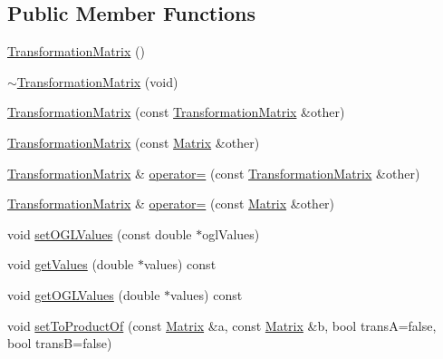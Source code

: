 \subsection*{Public Member Functions}
\begin{DoxyCompactItemize}
\item 
\hyperlink{classCartWheel_1_1Math_1_1TransformationMatrix_aa188aa955061de541799126a392a56b0}{TransformationMatrix} ()
\item 
\hyperlink{classCartWheel_1_1Math_1_1TransformationMatrix_aadbc4b5a1060136e7b5162fa340e537e}{$\sim$TransformationMatrix} (void)
\item 
\hyperlink{classCartWheel_1_1Math_1_1TransformationMatrix_ae75b07262c9166a0f648a3cdb3599c11}{TransformationMatrix} (const \hyperlink{classCartWheel_1_1Math_1_1TransformationMatrix}{TransformationMatrix} \&other)
\item 
\hyperlink{classCartWheel_1_1Math_1_1TransformationMatrix_ad1e2732727abf1943a5ef9443f19eb61}{TransformationMatrix} (const \hyperlink{classCartWheel_1_1Math_1_1Matrix}{Matrix} \&other)
\item 
\hyperlink{classCartWheel_1_1Math_1_1TransformationMatrix}{TransformationMatrix} \& \hyperlink{classCartWheel_1_1Math_1_1TransformationMatrix_a3b85f165673e14e45fa241de4a883ed4}{operator=} (const \hyperlink{classCartWheel_1_1Math_1_1TransformationMatrix}{TransformationMatrix} \&other)
\item 
\hyperlink{classCartWheel_1_1Math_1_1TransformationMatrix}{TransformationMatrix} \& \hyperlink{classCartWheel_1_1Math_1_1TransformationMatrix_ab04a5715c7f1ff7dd912b34abfce10c4}{operator=} (const \hyperlink{classCartWheel_1_1Math_1_1Matrix}{Matrix} \&other)
\item 
void \hyperlink{classCartWheel_1_1Math_1_1TransformationMatrix_a004de1c6f16e401e4155f7a33e48c5a5}{setOGLValues} (const double $\ast$oglValues)
\item 
void \hyperlink{classCartWheel_1_1Math_1_1TransformationMatrix_ab66e3548ed04ac0779652b6ad69096e2}{getValues} (double $\ast$values) const 
\item 
void \hyperlink{classCartWheel_1_1Math_1_1TransformationMatrix_a0edba5cf54cf8c0330acdfcedaf664f2}{getOGLValues} (double $\ast$values) const 
\item 
void \hyperlink{classCartWheel_1_1Math_1_1TransformationMatrix_aa30793678e416efa275e9ede54650bff}{setToProductOf} (const \hyperlink{classCartWheel_1_1Math_1_1Matrix}{Matrix} \&a, const \hyperlink{classCartWheel_1_1Math_1_1Matrix}{Matrix} \&b, bool transA=false, bool transB=false)

\end{DoxyCompactItemize}

